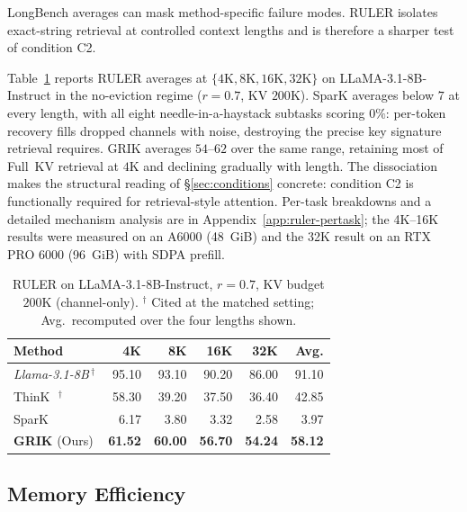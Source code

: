 \documentclass{article}
\begin{document}
LongBench averages can mask method-specific failure modes. RULER isolates exact-string retrieval at controlled context lengths and is therefore a sharper test of condition C2.
 
Table~\ref{tab:ruler-summary} reports RULER averages at $\{4\text{K}, 8\text{K}, 16\text{K}, 32\text{K}\}$ on LLaMA-3.1-8B-Instruct in the no-eviction regime ($r{=}0.7$, KV $200$K). SparK averages below $7$ at every length, with all eight needle-in-a-haystack subtasks scoring $0\%$: per-token recovery fills dropped channels with noise, destroying the precise key signature retrieval requires. GRIK averages $54$--$62$ over the same range, retaining most of Full~KV retrieval at $4$K and declining gradually with length. The dissociation makes the structural reading of \S\ref{sec:conditions} concrete: condition C2 is functionally required for retrieval-style attention. Per-task breakdowns and a detailed mechanism analysis are in Appendix~\ref{app:ruler-pertask}; the 4K--16K results were measured on an A6000 (48~GiB) and the 32K result on an RTX PRO 6000 (96~GiB) with SDPA prefill.
 
\begin{table}[t!]
\centering
\small
\setlength{\tabcolsep}{4pt}
\renewcommand{\arraystretch}{1.15}
\caption{RULER on LLaMA-3.1-8B-Instruct, $r{=}0.7$, KV budget $200$K (channel-only). $^\dagger$ Cited at the matched setting; Avg.\ recomputed over the four lengths shown.}
\label{tab:ruler-summary}
\begin{tabular}{@{}l rrrr r@{}}
\toprule
\textbf{Method} & \textbf{4K} & \textbf{8K} & \textbf{16K} & \textbf{32K} & \textbf{Avg.} \\
\midrule
\textit{Llama-3.1-8B}\,$^\dagger$  & 95.10 & 93.10 & 90.20 & 86.00 & 91.10 \\
ThinK~\citep{think}\,$^\dagger$    & 58.30 & 39.20 & 37.50 & 36.40 & 42.85 \\
SparK~\citep{spark}                &  6.17 &  3.80 &  3.32 &  2.58 &  3.97 \\
\rowcolor{gray!15}
\textbf{GRIK} (Ours)               & \textbf{61.52} & \textbf{60.00} & \textbf{56.70} & \textbf{54.24} & \textbf{58.12} \\
\bottomrule
\end{tabular}
\end{table}
 
 
\subsection{Memory Efficiency}
\label{sec:memory}
\end{document}
